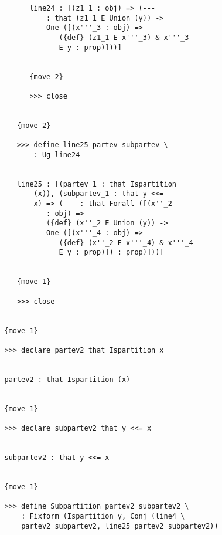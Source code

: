 \documentclass[12pt]{article}
\begin{document}
\begin{verbatim}
         line24 : [(z1_1 : obj) => (--- 
             : that (z1_1 E Union (y)) -> 
             One ([(x'''_3 : obj) => 
                ({def} (z1_1 E x'''_3) & x'''_3 
                E y : prop)]))]


         {move 2}

         >>> close


      {move 2}

      >>> define line25 partev subpartev \
          : Ug line24


      line25 : [(partev_1 : that Ispartition 
          (x)), (subpartev_1 : that y <<= 
          x) => (--- : that Forall ([(x''_2 
             : obj) => 
             ({def} (x''_2 E Union (y)) -> 
             One ([(x'''_4 : obj) => 
                ({def} (x''_2 E x'''_4) & x'''_4 
                E y : prop)]) : prop)]))]


      {move 1}

      >>> close


   {move 1}

   >>> declare partev2 that Ispartition x


   partev2 : that Ispartition (x)


   {move 1}

   >>> declare subpartev2 that y <<= x


   subpartev2 : that y <<= x


   {move 1}

   >>> define Subpartition partev2 subpartev2 \
       : Fixform (Ispartition y, Conj (line4 \
       partev2 subpartev2, line25 partev2 subpartev2))



\end{verbatim}
\end{document}
